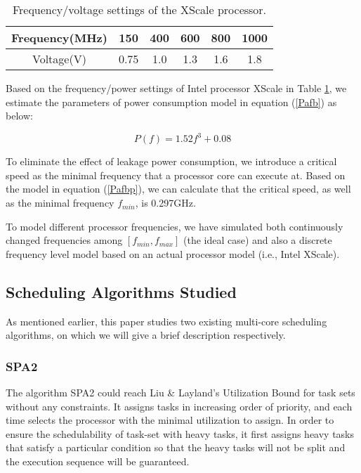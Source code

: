 \documentclass[12pt, journal,compsoc]{IEEEtran}
\begin{document}
\begin{table}[!t]
\renewcommand{\arraystretch}{1.3}
\caption{Frequency/voltage settings of the XScale processor.}
\label{fp}
\centering
\begin{tabular}{|c||c|c|c|c|c|}
\hline
Frequency(MHz) & 150 & 400 & 600 & 800 & 1000\\
\hline
Voltage(V) & 0.75 & 1.0 & 1.3 & 1.6 & 1.8\\
\hline
\end{tabular}
\end{table}

Based on the frequency/power settings of Intel processor XScale\cite{Xu:2004:PPE:1017753.1017767} in Table \ref{fp}, we estimate the parameters of power consumption model in equation (\ref{Pafb}) as below:

\begin{equation}
\label{Pafbp}
P(f) = 1.52 {f^3} + 0.08
\end{equation}

To eliminate the effect of leakage power consumption, we introduce a critical speed \cite{Chen:2007:PDP:1326073.1326132} as the minimal frequency that a processor core can execute at. Based on the model in equation (\ref{Pafbp}), we can calculate that the critical speed, as well as the minimal frequency $f_{min}$, is 0.297GHz.



To model different processor frequencies, we have simulated both continuously changed frequencies among $[f_{min}, f_{max}]$ (the ideal case) and also a discrete frequency level model based on an actual processor model (i.e., Intel XScale).

\subsection{Scheduling Algorithms Studied}

As mentioned earlier, this paper studies two existing multi-core scheduling algorithms, on which we will give a brief description respectively.

\subsubsection{SPA2}

The algorithm SPA2 \cite{Guan:2010:FMS:1828428.1829220} could reach Liu \& Layland's Utilization Bound \cite{Liu:1973:SAM:321738.321743} for task sets without any constraints. It assigns tasks in increasing order of priority, and each time selects the processor with the minimal utilization to assign. In order to ensure the schedulability of task-set with heavy tasks, it first assigns heavy tasks that satisfy a particular condition so that the heavy tasks will not be split and the execution sequence will be guaranteed.
\end{document}
